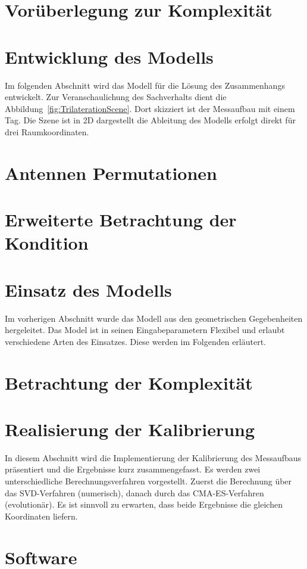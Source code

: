 \section{Vorüberlegung zur Komplexität}
\label{sec:Komplexity1}

%
\section{Entwicklung des Modells}
\label{sec:model_developement}
Im folgenden Abschnitt wird das Modell für die Lösung des Zusammenhangs entwickelt. Zur Veranschaulichung des Sachverhalts dient die Abbildung~\ref{fig:TrilaterationScene}. Dort skizziert ist der Messaufbau mit einem Tag. Die Szene ist in 2D dargestellt die Ableitung des Modells erfolgt direkt für drei Raumkoordinaten.
%

%
\section{Antennen Permutationen}

%
\section{Erweiterte Betrachtung der Kondition}
%

%
\section{Einsatz des Modells}
\label{sec:use_of_model}
Im vorherigen Abschnitt wurde das Modell aus den geometrischen Gegebenheiten hergeleitet. Das Model ist in seinen Eingabeparametern Flexibel und erlaubt verschiedene Arten des Einsatzes. Diese werden im Folgenden erläutert.
%

%
\section{Betrachtung der Komplexität}
\label{sec:Komplexity2}

%
\section{Realisierung der Kalibrierung}
\label{sec:calibration}
In diesem Abschnitt wird die Implementierung der Kalibrierung des Messaufbaus präsentiert und die Ergebnisse kurz zusammengefasst. Es werden zwei unterschiedliche Berechnungsverfahren vorgestellt. Zuerst die Berechnung über das SVD-Verfahren (numerisch), danach durch das CMA-ES-Verfahren (evolutionär). Es ist sinnvoll zu erwarten, dass beide Ergebnisse die gleichen Koordinaten liefern.
%

%
\section{Software}
\label{sec:sw}

